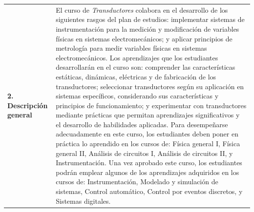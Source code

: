 \documentclass[letterpaper]{article}%
\begin{document}
\begin{tabularx}{\textwidth}{p{3cm}p{13cm}}%
\par\fontsize{12}{14}\selectfont \textbf{\textcolor{parte}{2. Descripción general}}&El curso de \emph{Transductores} colabora en el desarrollo de los siguientes rasgos del plan de estudios: implementar sistemas de instrumentación para la medición y modificación de variables físicas en sistemas electromecánicos; y aplicar principios de metrología para medir variables físicas en sistemas electromecánicos. \newline\newline Los aprendizajes que los estudiantes desarrollarán en el curso son: comprender las características estáticas, dinámicas, eléctricas y de fabricación de los transductores; seleccionar transductores según su aplicación en sistemas específicos, considerando sus características y principios de funcionamiento; y experimentar con transductores mediante prácticas que permitan aprendizajes significativos y el desarrollo de habilidades aplicadas. \newline\newline Para desempeñarse adecuadamente en este curso, los estudiantes deben poner en práctica lo aprendido en los cursos de: Física general I, Física general II, Análisis de circuitos I, Análisis de circuitos II, y Instrumentación. \newline\newline Una vez aprobado este curso, los estudiantes podrán emplear algunos de los aprendizajes adquiridos en los cursos de: Instrumentación, Modelado y simulación de sistemas, Control automático, Control por eventos discretos, y Sistemas digitales. \\%
\end{tabularx}%
\vspace*{4mm}%
\newline%
\end{document}
